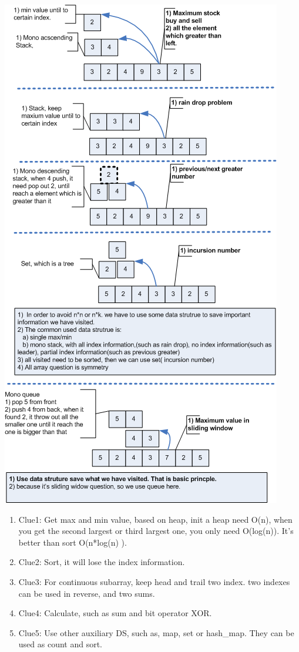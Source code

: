 \documentclass[a4paper,11pt,twoside]{book}
\begin{document}
\begin{center}
	\includegraphics[scale=0.64]{pics/array.png} \newline
\end{center}

\begin{enumerate}
	\item Clue1: Get max and min value, based on heap, init a heap need O(n), when you get the second largest or third largest one, you only need O(log(n)). It's better than sort O(n*log(n) ). 
	
	\item Clue2: Sort, it will lose the index information. 
	
	\item Clue3: For continuous subarray, keep head and trail two index. two indexes can be used in reverse, and two sums. 
	
	\item Clue4: Calculate, such as sum and bit operator XOR. 
	
	\item Clue5: Use other auxiliary DS, such as, map, set or hash\_map.  They can be used as count and sort. 
\end{enumerate}
\end{document}
